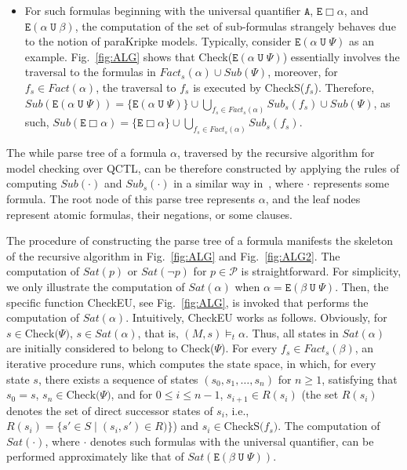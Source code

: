 \documentclass{entcs}
\begin{document}
\begin{itemize}
\item For such formulas beginning with the universal quantifier
$\texttt{A}$, $\texttt{E}\Box\alpha$, and
$\texttt{E}(\alpha\;\texttt{U}\;\beta)$, the computation of the
set of sub-formulas strangely behaves due to the notion of
paraKripke models. Typically, consider
$\texttt{E}(\alpha\;\texttt{U}\;\Psi)$ as an example.
Fig.~\ref{fig:ALG} shows that
Check($\texttt{E}(\alpha\;\texttt{U}\;\Psi)$) essentially involves
the traversal to the formulas in $Fact_s(\alpha)\cup Sub(\Psi)$,
moreover, for $f_s\in Fact(\alpha)$, the traversal to $f_s$ is
executed by CheckS($f_s$). Therefore,
$Sub(\texttt{E}(\alpha\;\texttt{U}\;\Psi))=\{\texttt{E}(\alpha\;\texttt{U}\;\Psi)\}\cup
\bigcup_{f_s\in Fact_s(\alpha)} Sub_s(f_s) \cup Sub(\Psi)$, as
such,
$Sub(\texttt{E}\Box\alpha)=\{\texttt{E}\Box\alpha\}\cup\bigcup_{f_s\in
Fact_s(\alpha)}Sub_s(f_s)$.
\end{itemize}\normalsize
The while parse tree of a formula $\alpha$, traversed by the
recursive algorithm for model checking over QCTL, can be therefore
constructed by applying the rules of computing $Sub(\cdot)$ and
$Sub_s(\cdot)$ in a similar way in~\cite{TL}, where $\cdot$
represents some formula. The root node of this parse tree
represents $\alpha$, and the leaf nodes represent atomic formulas,
their negations, or some clauses.

The procedure of constructing the parse tree of a formula manifests
the skeleton of the recursive algorithm in Fig.~\ref{fig:ALG} and
Fig.~\ref{fig:ALG2}. The computation of $Sat(p)$ or $Sat(\neg p)$
for $p\in\mathcal{P}$ is
 straightforward. For simplicity, we only illustrate the
 computation of $Sat(\alpha)$ when
 $\alpha=\texttt{E}(\beta\;\texttt{U}\;\Psi)$. Then,
  the specific
function CheckEU, see Fig.~\ref{fig:ALG}, is invoked that performs
the computation of $Sat(\alpha)$. Intuitively, CheckEU works as
follows. Obviously, for $s\in\mbox{Check($\Psi$)}$, $s\in
Sat(\alpha)$, that is, $ (M,s)\models_t\alpha$. Thus, all states
in $Sat(\alpha)$ are initially considered to belong to
Check($\Psi$). For every $f_s\in Fact_s(\beta)$, an iterative
procedure runs, which computes the state space, in which, for
every state $s$, there exists a sequence of states
$(s_0,s_1,\ldots,s_n)$ for $n\geq 1$, satisfying that $s_0=s$,
$s_n\in \mbox{Check($\Psi$)}$, and for $0\leq i\leq n-1$,
$s_{i+1}\in R(s_i)$ (the set $R(s_i)$ denotes the set of direct
successor states of $s_i$, i.e., $R(s_i)=\{s'\in S\;|\;(s_i,s')\in
R)\}$) and $s_i\in\mbox{CheckS($f_s$)}$. The computation of
$Sat(\cdot)$, where $\cdot$ denotes such formulas with the
universal quantifier, can be performed approximately like that of
$Sat(\texttt{E}(\beta\;\texttt{U}\;\Psi))$.
\end{document}
